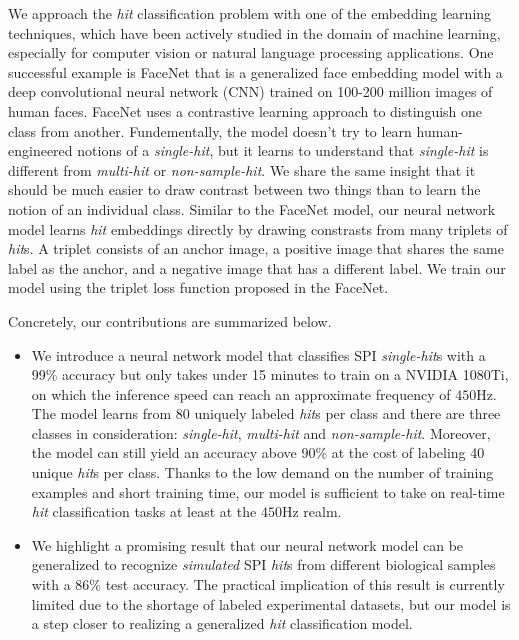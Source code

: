 We approach the \textit{hit} classification problem with one of the embedding
learning techniques, which have been actively studied in the domain of machine
learning, especially for computer vision or natural language processing
applications.  One successful example is FaceNet
\cite{schroffFaceNetUnifiedEmbedding2015} that is a generalized face embedding
model with a deep convolutional neural network (CNN) trained on 100-200 million
images of human faces.  FaceNet uses a contrastive learning approach to
distinguish one class from another.  Fundementally, the model doesn't try to
learn human-engineered notions of a \textit{single-hit}, but it learns to
understand that \textit{single-hit} is different from \textit{multi-hit} or
\textit{non-sample-hit}.  We share the same insight that it should be much
easier to draw contrast between two things than to learn the notion of an
individual class.  Similar to the FaceNet model, our neural network model learns
\textit{hit} embeddings directly by drawing constrasts from many triplets of
\textit{hit}s.  A triplet consists of an anchor image, a positive image that
shares the same label as the anchor, and a negative image that has a different
label.  We train our model using the triplet loss function proposed in the
FaceNet.  

Concretely, our contributions are summarized below.  

\begin{itemize}

    \item We introduce a neural network model that classifies SPI
    \textit{single-hit}s with a 99\% accuracy but only takes under 15 minutes to
    train on a NVIDIA 1080Ti, on which the inference speed can reach an
    approximate frequency of $450 \text{Hz}$.  The model learns from 80 uniquely
    labeled \textit{hit}s per class and there are three classes in consideration:
    \textit{single-hit}, \textit{multi-hit} and \textit{non-sample-hit}.
    Moreover, the model can still yield an accuracy above 90\% at the cost of
    labeling 40 unique \textit{hit}s per class.  Thanks to the low demand on the
    number of training examples and short training time, our model is sufficient
    to take on real-time \textit{hit} classification tasks at least at the $450
    \text{Hz}$ realm.  

    \item We highlight a promising result that our neural network model can be
    generalized to recognize \textit{simulated} SPI \textit{hit}s from different
    biological samples with a 86\% test accuracy.  The practical implication of
    this result is currently limited due to the shortage of labeled experimental
    datasets, but our model is a step closer to realizing a generalized
    \textit{hit} classification model.  

\end{itemize}
